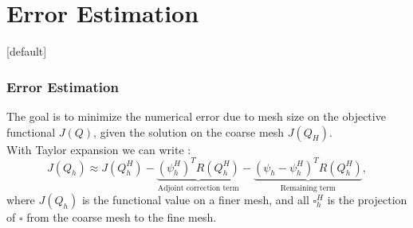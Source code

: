 \documentclass{beamer}
\makeatletter
\newenvironment{withoutheadline}{
        \setbeamertemplate{headline}[default]
        \def\beamer@entrycode{\vspace*{-\headheight}}
    }{}
\makeatother
\begin{document}
\section{Error Estimation}
\begin{withoutheadline}
\begin{frame}\frametitle{Error Estimation} 
The goal is to minimize the numerical error due to mesh size on the objective functional $ J(Q) $, given the solution on the coarse mesh $ J(Q_H) $.\\
With Taylor expansion we can write
:
\begin{displaymath}
J(Q_h) \approx  J(Q^H_h) - \underbrace{(\psi^H_h)^T R(Q^H_h)}_\text{Adjoint correction term} - 
\underbrace{(\psi_h - \psi^H_h)^T R(Q^H_h)}_\text{Remaining term},
\end{displaymath}
where $ J(Q_h) $ is the functional value on a finer mesh, and all $\square^H_h$ is the projection of $\square$ from the coarse mesh to the fine mesh.
%
%
%

\end{frame}
\end{withoutheadline}
\end{document}

